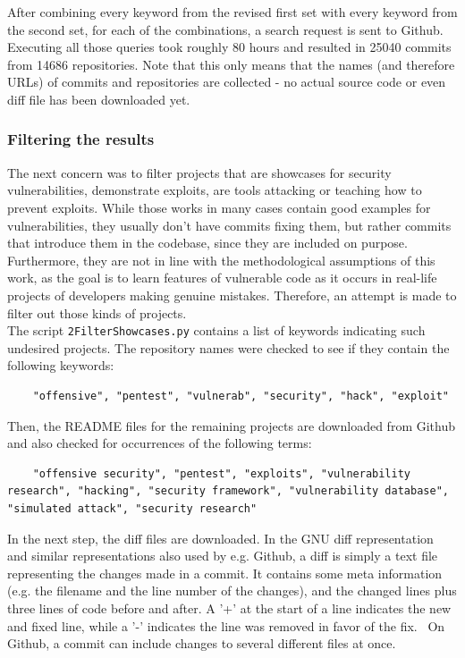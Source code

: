 \documentclass[
a4paper,
pagesize,
pdftex,
12pt,
twoside, %
BCOR=5mm, %
ngerman,
fleqn,
final,
]{scrartcl}
\begin{document}
	
	
	After combining every keyword from the revised first set with every keyword from the second set, for each of the combinations, a search request is sent to Github. Executing all those queries took roughly 80 hours and resulted in 25040 commits from 14686 repositories.
	Note that this only means that the names (and therefore URLs) of commits and repositories are collected - no actual source code or even diff file has been downloaded yet.
	
	\subsubsection{Filtering the results}
	
	The next concern was to filter projects that are showcases for security vulnerabilities, demonstrate exploits, are tools attacking or teaching how to prevent exploits. While those works in many cases contain good examples for vulnerabilities, they usually don't have commits fixing them, but rather commits that introduce them in the codebase, since they are included on purpose. Furthermore, they are not in line with the methodological assumptions of this work, as the goal is to learn features of vulnerable code as it occurs in real-life projects of developers making genuine mistakes. Therefore, an attempt is made to filter out those kinds of projects.\\
	The script \texttt{2FilterShowcases.py} contains a list of keywords indicating such undesired projects. The repository names were checked to see if they contain the following keywords:
	\begin{lstlisting}
	"offensive", "pentest", "vulnerab", "security", "hack", "exploit"
	\end{lstlisting}
	Then, the README files for the remaining projects are downloaded from Github and also checked for occurrences of the following terms:
	\begin{lstlisting}
	"offensive security", "pentest", "exploits", "vulnerability research", "hacking", "security framework", "vulnerability database", "simulated attack", "security research"
	\end{lstlisting}
	In the next step, the diff files are downloaded. In the GNU diff representation and similar representations also used by e.g. Github, a diff is simply a text file representing the changes made in a commit. It contains some meta information (e.g. the filename and the line number of the changes), and the changed lines plus three lines of code before and after. A '+' at the start of a line indicates the new and fixed line, while a '-' indicates the line was removed in favor of the fix.~\cite{Liu.2018} On Github, a commit can include changes to several different files at once.\\
\end{document}
